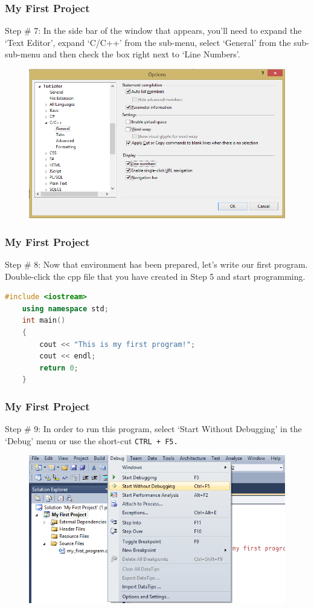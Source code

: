 \documentclass{beamer}
\begin{document}
\begin{frame}
    \frametitle{My First Project}
    Step \# 7: In the side bar of the window that appears, you'll need to expand the `Text Editor', expand `C/C++' from the sub-menu, select `General' from the sub-sub-menu and then check the box right next to `Line Numbers'.
    \begin{figure}
        \centering
        \includegraphics[scale=0.45]{step_13}
    \end{figure}
\end{frame}

\begin{frame}[fragile]
    \frametitle{My First Project}
    Step \# 8: Now that environment has been prepared, let's write our first program. Double-click the cpp file that you have created in Step 5 and start programming.
    \begin{lstlisting}[language=C++, basicstyle=\ttfamily,keywordstyle=\color{blue}]
    #include <iostream>
    using namespace std;
    int main()
    {
        cout << "This is my first program!";
        cout << endl;
        return 0;
    }\end{lstlisting}
\end{frame}

\begin{frame}
    \frametitle{My First Project}
    Step \# 9: In order to run this program, select `Start Without Debugging' in the `Debug' menu or use the short-cut \tt{CTRL + F5}.
    \begin{figure}
        \centering
        \includegraphics[scale=0.45]{step_14}
    \end{figure}
\end{frame}
\end{document}
